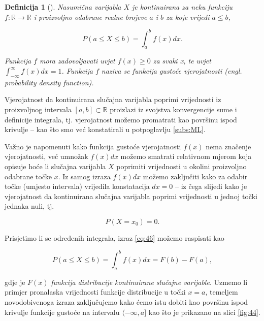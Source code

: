 \documentclass[a4paper,12pt,oneside]{memoir}
\newtheorem{definition}{Definicija}[chapter]
\begin{document}
                \begin{definition}[\cite{Dekking}]
                    Nasumična varijabla $X$ je kontinuirana za neku funkciju $f:\mathbb{R}\to \mathbb{R}$ i proizvoljno odabrane realne brojeve $a$ i $b$ za koje vrijedi $a\leq b$,

                    \begin{equation}
                        P(a\leq X\leq b)=\displaystyle\int_{a}^{b}f(x)dx.
                        \label{eq:46}
                    \end{equation}

                    Funkcija $f$ mora zadovoljavati uvjet $f(x)\geq 0$ za svaki x, te uvjet $\int_{-\infty}^{\infty}f(x)dx=1$. Funkcija $f$ naziva se funkcija gustoće vjerojatnosti (engl. probability density function).
                \end{definition}

                Vjerojatnost da kontinuirana slučajna varijabla poprimi vrijednosti iz proizvoljnog intervala $\left[a,b\right]\subset\mathbb{R}$ proizlazi iz svojstva konvergencije sume i definicije integrala, tj. vjerojatnost možemo promatrati kao površinu ispod krivulje -- kao što smo već konstatirali u potpoglavlju \ref{subs:ML}.

                Važno je napomenuti kako funkcija gustoće vjerojatnosti $f(x)$ nema značenje vjerojatnosti, već umnožak $f(x)dx$ možemo smatrati relativnom mjerom koja opisuje hoće li slučajna varijabla $X$ poprimiti vrijednosti u okolini proizvoljno odabrane točke $x$. Iz samog izraza $f(x)dx$ možemo zaključiti kako za odabir točke (umjesto intervala) vrijedila konstatacija $dx=0$ -- iz čega slijedi kako je vjerojatnost da kontinuirana slučajna varijabla poprimi vrijednosti u jednoj točki jednaka nuli, tj.

                \begin{equation}
                    P(X=x_0)=0.                    
                \end{equation}
                
                Prisjetimo li se određenih integrala, izraz \eqref{eq:46} možemo raspisati kao

                \begin{equation}
                    P(a\leq X\leq b)=\displaystyle\int_{a}^{b}f(x)dx=F(b)-F(a),
                \end{equation}
                
                gdje je $F(x)$ \textit{funkcija distribucije kontinuirane slučajne varijable}. Uzmemo li primjer pronalaska vrijednosti funkcije distribucije u točki $x=a$, temeljem novodobivenoga izraza zaključujemo kako ćemo istu dobiti kao površinu ispod krivulje funkcije gustoće na intervalu $\langle-\infty,a]$ kao što je prikazano na slici \ref{fig:44}.
\end{document}
